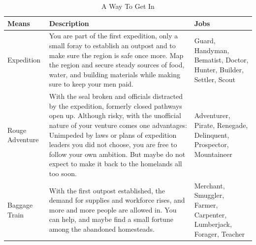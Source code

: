 

\pagebreak

\onecolumn

\begin{table}[H]
	\small
	\centering
	\caption{A Way To Get In}
	\begin{tabularx}{\textwidth}{
		>{\raggedleft}p{4.2em}
		X %
		>{\raggedright\arraybackslash}p{7.9em}}
		\toprule
		Means                   & Description                                                                                                                                                                                                                                              & Jobs                                                         \\
		\midrule
		Expedition              & You are part of the first expedition, only a small foray to establish an outpost and to make sure the region is safe once more. Map the region and secure steady sources of food, water, and building materials while making sure to keep your men paid. & Guard, Handyman, Bematist, Doctor, Hunter, Builder, Settler,
		Scout                                                                                                                                                                                                                                                                                                                                             \\
		\midrule
		Rouge Adventure         & With the seal broken and officials distracted by the
		expedition, formerly closed pathways open up. Although risky, with the
		unofficial nature of your venture comes one advantages: Unimpeded by
		laws or plans of expedition leaders you did not choose, you are free to
		follow your own ambition. But maybe do not expect to make it back to the
		homelands all too soon. & Adventurer, Pirate, Renegade, Delinquent,
		Prospector, Mountaineer                                                                                                                                                                                                                                                                                                                           \\
		\midrule
		Baggage Train           & With the first outpost established, the demand for
		supplies and workforce rises, and more and more people are allowed in.
		You can help, and maybe find a small fortune among the abandoned
		homesteads.             & Merchant, Smuggler, Farmer, Carpenter, Lumberjack,
		Forager, Teacher                                                                                                                                                                                                                                                                                                                                  \\
		\bottomrule
	\end{tabularx}
\end{table}
